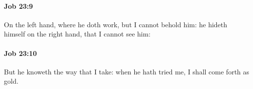 		\paragraph{Job 23:9} %
			\label{JOB-23-9}

			On the left hand, where he doth work, but I cannot behold him: he hideth himself on the right hand, that I cannot see him:


		\paragraph{Job 23:10} %
			\label{JOB-23-10}

			But he knoweth the way that I take: when he hath tried me, I shall come forth as gold.


